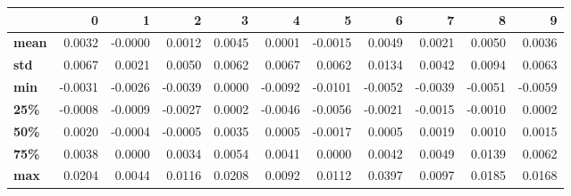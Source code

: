 \begin{tabular}{lrrrrrrrrrr}
\toprule
{} &       0 &       1 &       2 &       3 &       4 &       5 &       6 &       7 &       8 &       9 \\
\midrule
\textbf{mean} &  0.0032 & -0.0000 &  0.0012 &  0.0045 &  0.0001 & -0.0015 &  0.0049 &  0.0021 &  0.0050 &  0.0036 \\
\textbf{std } &  0.0067 &  0.0021 &  0.0050 &  0.0062 &  0.0067 &  0.0062 &  0.0134 &  0.0042 &  0.0094 &  0.0063 \\
\textbf{min } & -0.0031 & -0.0026 & -0.0039 &  0.0000 & -0.0092 & -0.0101 & -0.0052 & -0.0039 & -0.0051 & -0.0059 \\
\textbf{25\% } & -0.0008 & -0.0009 & -0.0027 &  0.0002 & -0.0046 & -0.0056 & -0.0021 & -0.0015 & -0.0010 &  0.0002 \\
\textbf{50\% } &  0.0020 & -0.0004 & -0.0005 &  0.0035 &  0.0005 & -0.0017 &  0.0005 &  0.0019 &  0.0010 &  0.0015 \\
\textbf{75\% } &  0.0038 &  0.0000 &  0.0034 &  0.0054 &  0.0041 &  0.0000 &  0.0042 &  0.0049 &  0.0139 &  0.0062 \\
\textbf{max } &  0.0204 &  0.0044 &  0.0116 &  0.0208 &  0.0092 &  0.0112 &  0.0397 &  0.0097 &  0.0185 &  0.0168 \\
\bottomrule
\end{tabular}

